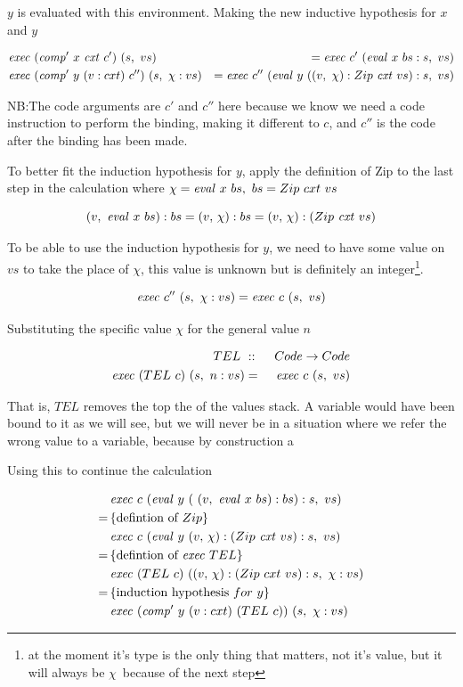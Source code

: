 \documentclass {article}
\begin{document}
$y$ is evaluated with this environment.
Making the new inductive hypothesis for $x$ and $y$

\begin{eqnarray*}
	&\Exec (\Compp  x\ \cxtm c')\ (s,\ vs)
		&= \Exec c'\ (\evalf  x\ bs : s,\ vs)\\
	&\Exec (\Compp  y\ (v:cxt)\ c'')\ (s,\ \chi : vs) 
		&= \Exec c''\ (\evalf  y\ 
					(
					(v,\ \chi) : Zip\ \cxtm vs) : s,\ vs
					)\\
\end{eqnarray*}

NB:The code arguments are $c'$ and $c''$ 
here because we know we need a code instruction
to perform the binding, making it different to $c$,
and $c''$ is the code after the binding has been made.

To better fit the induction hypothesis for $y$,
apply the definition of Zip to the last step in the calculation
where \( \chi = \evalf  x\ bs,\ bs = Zip\ cxt\ vs \)

\[ (v,\ \mathit{eval\ }  x\ bs) :bs = (v,\, \chi):bs = (v,\, \chi):(Zip\ \mathit{cxt\ } vs) \]

To be able to use the induction hypothesis for $y$,
we need to have some value on $vs$ to take the place of $\chi$,
this value is unknown but is definitely an integer\footnote{
at the moment it's
type is the only thing that matters, not it's value,
but it will always be $\chi$\ because of the next step}.

\[ \Exec c''\ (s,\ \chi : vs) = \Exec c\ (s,\ vs) \]

Substituting the specific value $\chi$ for the general value $n$

\begin{eqnarray*}
TEL\ &::&\ Code \rightarrow Code \\
\mathit{exec\ } (TEL\ c)\ (s,\ n:vs) &=& \mathit{exec\ } c\ (s,\ vs)
\end{eqnarray*}

That is, $TEL$ removes the top the of the values stack.
A variable would have been bound to it as we will see,
but we will never be in a situation where we refer the wrong
value to a variable, because by construction a 

Using this to continue the calculation

\begin{align*}
&\mathit{exec\ } c\ (\mathit{eval\ }  y\ (\ (v,\ \mathit{eval\ }  x\ bs) :bs) : s,\ vs) \\
=\, & \{ \mbox{defintion of}\ Zip \} \\
&\mathit{exec\ } c\ (\mathit{eval\ }  y\ (v,\, \chi):(Zip\ \mathit{cxt\ } vs) : s,\ vs) \\
=\, & \{ \mbox{defintion of}\ \mathit{exec\ } TEL\} \\
&\mathit{exec\ } (TEL\ c)\ ((v,\, \chi):(Zip\ cxt\ vs) : s,\ \chi : vs) \\
=\, & \{ \mbox{induction hypothesis}\ for\ y \} \\
&\mathit{exec\ } (\mathit{comp'\ }  y\ (v:cxt)\ (TEL\ c))\ (s,\ \chi : vs)
\end{align*}
\end{document}
